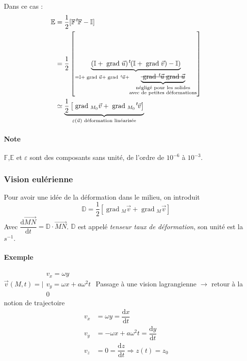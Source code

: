 \documentclass{article}
\newcommand{\deriv}{\mathrm{d}}
\newcommand{\grad}{\;\mathrm{grad}\;}
\newcommand{\transpose}{\hspace{.1em}{}^t\hspace{-.1em}}
\begin{document}
Dans ce cas :
\begin{align*}
\mathbb{E} & = \dfrac{1}{2}[\mathbb{F}\transpose \mathbb{F} - \mathbb{I}]\\
& = \dfrac{1}{2} \left[ \underbrace{(\mathbb{I} + \grad \vec{u})\transpose(\mathbb{I}+\grad \vec{v}) - \mathbb{I})}_{= \mathbb{I}+ \grad \vec{u} + \grad \transpose \vec{u} + \underbrace{\text{\sout{$\grad \transpose \vec{u}\grad \vec{u}$}}}_{\substack{\text{négligé pour les solides}\\\text{avec de petites déformations}}}} \right]\\
& \simeq \underbrace{\dfrac{1}{2} \left[ \grad_{M_0} \vec{v} + \grad_{M_0} \transpose\vec{v} \right]}_{\varepsilon (\vec{u})\text{ déformation linéarisée}}\\
\end{align*}

\paragraph{Note}
$\mathbb{F}$,$\mathbb{E}$ et $\varepsilon$ sont des composants sans unité, de l'ordre de $10^{-6}$ à $10^{-3}$.

\subsubsection{Vision eulérienne}
Pour avoir une idée de la déformation dans le milieu, on introduit
\[\mathbb{D} = \dfrac{1}{2} \left[ \grad_M \vec{v} + \grad_M \vec{v} \right]\]
Avec $\dfrac{\deriv  \overrightarrow{MN}}{\deriv t} = \mathbb{D} \cdot \overrightarrow{MN}$. $\mathbb{D}$ est appelé \emph{tenseur taux de déformation}, son unité est la $s^{-1}$.


\paragraph{Exemple} $\vec{v}(M,t) = \lvert \begin{matrix}
v_x = \omega y\\
v_y = \omega x + a\omega^2 t\\
0
\end{matrix}$
Passage à une vision lagrangienne $\to$ retour à la notion de trajectoire
\begin{align*}
v_x & = \omega y = \dfrac{\deriv x}{\deriv t}\\
v_y & = -\omega x + a\omega^2 t = \dfrac{\deriv y}{\deriv	t}\\
v_z & = 0 = \dfrac{\deriv z}{\deriv t} \Rightarrow z(t) = z_0
\end{align*}
\end{document}
